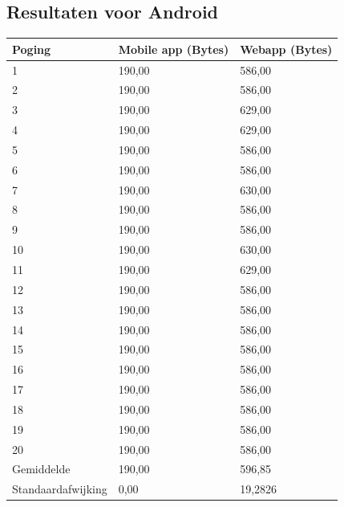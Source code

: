 \documentclass[pdftex,a4paper,12pt,twoside]{report}
\begin{document}
\subsection{Resultaten voor Android}
\begin{center}
  \begin{tabular}{ | l | l | l |}
      \hline
      Poging & Mobile app (Bytes) & Webapp (Bytes)
      \\ \hline
      1 & 190,00 & 586,00
      \\ \hline
      2 & 190,00 & 586,00
      \\ \hline
      3 & 190,00 & 629,00
      \\ \hline
      4 & 190,00 & 629,00
      \\ \hline
      5 & 190,00 & 586,00
      \\ \hline
      6 & 190,00 & 586,00
      \\ \hline
      7 & 190,00 & 630,00
      \\ \hline
      8 & 190,00 & 586,00
      \\ \hline
      9 & 190,00 & 586,00
      \\ \hline
      10 & 190,00 & 630,00
      \\ \hline
      11 & 190,00 & 629,00
      \\ \hline
      12 & 190,00 & 586,00
      \\ \hline
      13 & 190,00 & 586,00
      \\ \hline
      14 & 190,00 & 586,00
      \\ \hline
      15 & 190,00 & 586,00
      \\ \hline
      16 & 190,00 & 586,00
      \\ \hline
      17 & 190,00 & 586,00
      \\ \hline
      18 & 190,00 & 586,00
      \\ \hline
      19 & 190,00 & 586,00
      \\ \hline
      20 & 190,00 & 586,00
      \\ \hline
      Gemiddelde & 190,00 & 596,85
      \\ \hline
      Standaardafwijking & 0,00 & 19,2826
      \\ \hline
  \end{tabular}
\end{center}
\newpage
\end{document}
